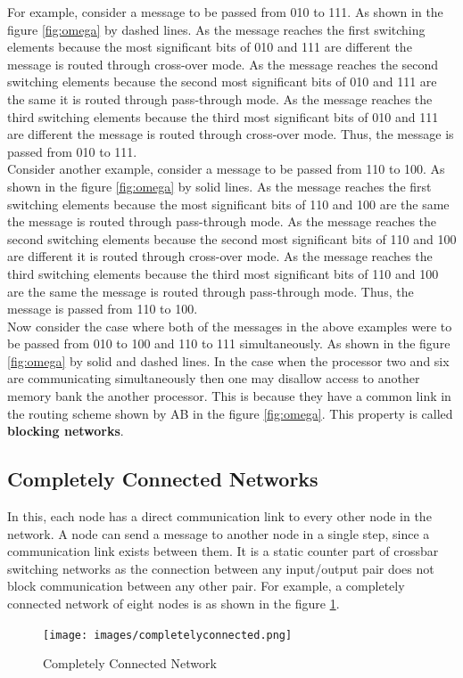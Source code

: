 \documentclass[12pt]{book}
\begin{document}
For example, consider a message to be passed from 010 to 111.
As shown in the figure \ref{fig:omega} by dashed lines. As the message reaches the first switching elements because the most significant bits of 010 and 111 are different
the message is routed through cross-over mode. As the message reaches the second switching elements because the second most significant bits of 010 and 111 are the same it 
is routed through pass-through mode. As the message reaches the third switching elements because the third most significant bits of 010 and 111 are different 
the message is routed through cross-over mode. Thus, the message is passed from 010 to 111. \\
Consider another example, consider a message to be passed from 110 to 100. 
As shown in the figure \ref{fig:omega} by solid lines. As the message reaches the first switching elements because the most significant bits of 110 and 100 are the same
the message is routed through pass-through mode. As the message reaches the second switching elements because the second most significant bits of 110 and 100 are different it
is routed through cross-over mode. As the message reaches the third switching elements because the third most significant bits of 110 and 100 are the same
the message is routed through pass-through mode. Thus, the message is passed from 110 to 100.\\
Now consider the case where both of the messages in the above examples were to be passed from 010 to 100 and 110 to 111 simultaneously.
As shown in the figure \ref{fig:omega} by solid and dashed lines. In the case when the processor two and six are communicating simultaneously
then one may disallow access to another memory bank the another processor. This is because they have a common link in the routing scheme shown by AB in the figure \ref{fig:omega}.
This property is called \textbf{blocking networks}.

\subsection{Completely Connected Networks}
In this, each node has a direct communication link to every other node in the network. A node can send a message to another node
in a single step, since a communication link exists between them. 
It is a static counter part of crossbar switching networks as the connection between any input/output pair does not block communication between any other pair.
For example, a completely connected network of eight nodes is as shown in the figure \ref{fig:complete}.
\begin{figure}[H]
    \centering
    \texttt{[image: images/completelyconnected.png]}
    \caption{Completely Connected Network}
    \label{fig:complete}
\end{figure}
\end{document}
